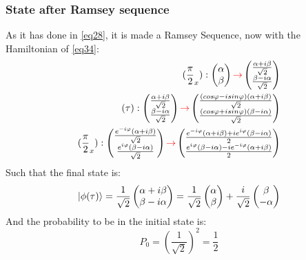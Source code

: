 \documentclass{article}
\begin{document}
\subsubsection{State after Ramsey sequence}
As it has done in \ref{eq28}, it is made a Ramsey Sequence, now with the Hamiltonian of \ref{eq34}:
\begin{equation}\label{eq35}\begin{aligned}
(\frac{\pi}{2}_x):\begin{pmatrix}\alpha \\\beta  \end{pmatrix}\textcolor{red}{\rightarrow}\begin{pmatrix}\frac{\alpha+i\beta}{\sqrt{2}} \\ \frac{\beta-i\alpha}{\sqrt{2}} \end{pmatrix}\\
(\tau):\begin{pmatrix}\frac{\alpha+i\beta}{\sqrt{2}}\\ \frac{\beta-i\alpha}{\sqrt{2}} \end{pmatrix}\textcolor{red}{\rightarrow}\begin{pmatrix}\frac{(cos\varphi-isin\varphi)(\alpha+i\beta)}{\sqrt{2}}\\\frac{(cos\varphi+isin\varphi)(\beta-i\alpha)}{\sqrt{2}} \end{pmatrix}\\
(\frac{\pi}{2}_x):\begin{pmatrix}\frac{e^{-i\varphi}(\alpha+i\beta)}{\sqrt{2}}\\\frac{e^{i\varphi}(\beta-i\alpha)}{\sqrt{2}} \end{pmatrix}\textcolor{red}{\rightarrow}
\begin{pmatrix} \frac{e^{-i\varphi}(\alpha+i\beta)+ie^{i\varphi}(\beta-i\alpha)}{2}\\ \frac{e^{i\varphi}(\beta-i\alpha)-ie^{-i\varphi}(\alpha+i\beta)}{2}\end{pmatrix} \end{aligned}\end{equation}
Such that the final state is:
\begin{equation}\label{eq36}\ket{\phi(\tau)}=\frac{1}{\sqrt{2}}\begin{pmatrix} \alpha+i\beta \\ \beta-i\alpha \end{pmatrix}=\frac{1}{\sqrt{2}}\begin{pmatrix}\alpha \\ \beta\end{pmatrix}+\frac{i}{\sqrt{2}}\begin{pmatrix}\beta\\ -\alpha\end{pmatrix}\end{equation}
And the probability to be in the initial state is:
\begin{equation}\label{eq37}P_0=(\frac{1}{\sqrt{2}})^2=\frac{1}{2}\end{equation}
\end{document}
